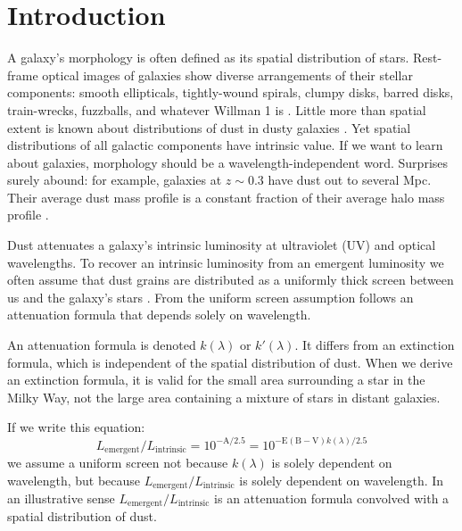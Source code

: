 \documentclass[referee]{aa}
\begin{document}


\maketitle

\section{Introduction}

A galaxy's morphology is often defined as its spatial distribution of stars.
Rest-frame optical images of galaxies show diverse arrangements of
their stellar components: smooth ellipticals, tightly-wound spirals, clumpy
disks, barred disks, train-wrecks, fuzzballs, and whatever Willman 1 is
\citep{willman05,willman11}.
Little more than spatial extent is known about distributions of dust in dusty
galaxies
\citep{younger10,diaz10,simpson15}.  Yet spatial distributions of
all galactic components have intrinsic value.  If we want to learn about
galaxies, morphology should be a wavelength-independent word.  Surprises
surely abound: for example, galaxies at $z \sim 0.3$ have dust out to several
Mpc.  Their average dust mass profile is a constant fraction of their average
halo mass profile \citep[][see also \citealt{zaritsky94}]{menard10}.

Dust attenuates a galaxy's intrinsic luminosity at ultraviolet (UV) and optical
wavelengths.  To recover an intrinsic luminosity from an emergent luminosity we
often assume that dust grains
are distributed as a uniformly thick screen between us and the galaxy's stars
\citep{calzetti94}.  From the uniform screen assumption follows an
attenuation formula that depends solely on wavelength.

An attenuation formula is denoted $k(\lambda)$ or $k'(\lambda)$.  It differs
from an extinction formula, which is independent of the spatial distribution
of dust.  When we derive an extinction formula, it is valid for the small area
surrounding a star in the Milky Way, not the large area containing a mixture of
stars in distant galaxies.

If we write this equation:
\begin{equation*}
L_{\mathrm{emergent}}/L_{\mathrm{intrinsic}} = 10^{-\mathrm{A}/2.5} = 10^{-\mathrm{E(B-V)} k(\lambda)/2.5}
\end{equation*}
we assume a uniform screen not because $k(\lambda)$ is solely dependent on
wavelength, but because $L_{\mathrm{emergent}}/L_{\mathrm{intrinsic}}$ is solely
dependent on
wavelength.  In an illustrative sense
$L_{\mathrm{emergent}}/L_{\mathrm{intrinsic}}$
is an attenuation formula convolved with a spatial distribution of dust.
\end{document}
